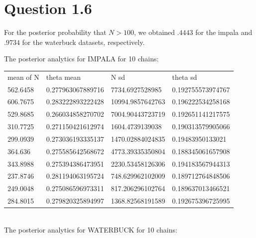 \documentclass[10pt]{article}
\begin{document}
\section{Question 1.6}
For the posterior probability that $N>100$, we obtained $.4443$ for the impala and $.9734$ for the waterbuck datasets, respectively.

The posterior analytics for IMPALA for 10 chains:\\
\begin{table}[h]
\begin{tabular}{llll}
mean of N & theta mean        & N sd             & theta sd          \\
562.6458  & 0.277963067889716 & 7734.6927528985  & 0.192755573974767 \\
606.7675  & 0.283222893222428 & 10994.9857642763 & 0.196222534258168 \\
529.8685  & 0.266034858270702 & 7004.90443723719 & 0.192651141217575 \\
310.7725  & 0.271150421612974 & 1604.4739139038  & 0.190313579905066 \\
299.0939  & 0.273036193335137 & 1470.02884024835 & 0.19483950133021  \\
364.636   & 0.275585642568672 & 4773.39335350804 & 0.188345061657908 \\
343.8988  & 0.275394386473951 & 2230.53458126306 & 0.194183567944313 \\
237.8746  & 0.281194063195724 & 748.629962102009 & 0.189712764848506 \\
249.0048  & 0.275086596973311 & 817.206296102764 & 0.189637013466521 \\
284.8015  & 0.279820325894997 & 1368.82568191589 & 0.192675396725995
\end{tabular}
\end{table}\\
The posterior analytics for WATERBUCK for 10 chains:\\
\end{document}
